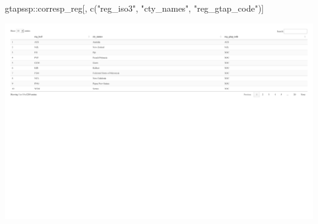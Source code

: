 \documentclass[
  letterpaper,
  DIV=11,
  numbers=noendperiod]{scrartcl}
\newenvironment{Shaded}{}{}
\newcommand{\FunctionTok}[1]{\textcolor[rgb]{0.39,0.29,0.61}{#1}}
\newcommand{\NormalTok}[1]{\textcolor[rgb]{0.12,0.11,0.11}{#1}}
\newcommand{\SpecialCharTok}[1]{\textcolor[rgb]{0.24,0.68,0.91}{#1}}
\newcommand{\StringTok}[1]{\textcolor[rgb]{0.75,0.01,0.01}{#1}}
\begin{document}
\begin{Shaded}
\begin{Highlighting}[]
\NormalTok{gtapssp}\SpecialCharTok{::}\NormalTok{corresp\_reg[, }\FunctionTok{c}\NormalTok{(}\StringTok{"reg\_iso3"}\NormalTok{, }\StringTok{"cty\_names"}\NormalTok{, }\StringTok{"reg\_gtap\_code"}\NormalTok{)]}
\end{Highlighting}
\end{Shaded}

\includegraphics{index_files/figure-pdf/unnamed-chunk-28-1.pdf}
\end{document}
